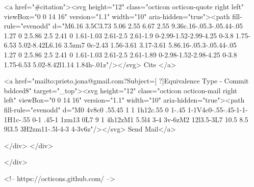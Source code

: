       <a  href="#citation"><svg height="12" class="octicon octicon-quote right left" viewBox="0 0 14 16" version="1.1" width="10" aria-hidden="true"><path fill-rule="evenodd" d="M6.16 3.5C3.73 5.06 2.55 6.67 2.55 9.36c.16-.05.3-.05.44-.05 1.27 0 2.5.86 2.5 2.41 0 1.61-1.03 2.61-2.5 2.61-1.9 0-2.99-1.52-2.99-4.25 0-3.8 1.75-6.53 5.02-8.42L6.16 3.5zm7 0c-2.43 1.56-3.61 3.17-3.61 5.86.16-.05.3-.05.44-.05 1.27 0 2.5.86 2.5 2.41 0 1.61-1.03 2.61-2.5 2.61-1.89 0-2.98-1.52-2.98-4.25 0-3.8 1.75-6.53 5.02-8.42l1.14 1.84h-.01z"/></svg> Cite
      </a>

      <a href="mailto:prieto.jona@gmail.com?Subject=[ ?]Equivalence Type - Commit bddced8" target="_top"><svg height="12" class="octicon octicon-mail right left" viewBox="0 0 14 16" version="1.1" width="10" aria-hidden="true"><path fill-rule="evenodd" d="M0 4v8c0 .55.45 1 1 1h12c.55 0 1-.45 1-1V4c0-.55-.45-1-1-1H1c-.55 0-1 .45-1 1zm13 0L7 9 1 4h12zM1 5.5l4 3-4 3v-6zM2 12l3.5-3L7 10.5 8.5 9l3.5 3H2zm11-.5l-4-3 4-3v6z"/></svg> Send Mail</a>

    </div>
  </div>

</div>

<!-- https://octicons.github.com/ -->





